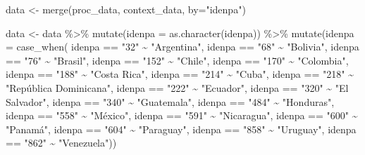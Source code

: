 \documentclass[
  letterpaper,
  DIV=11,
  numbers=noendperiod]{scrartcl}
\newenvironment{Shaded}{\begin{snugshade}}{\end{snugshade}}
\newcommand{\AttributeTok}[1]{\textcolor[rgb]{0.40,0.45,0.13}{#1}}
\newcommand{\FunctionTok}[1]{\textcolor[rgb]{0.28,0.35,0.67}{#1}}
\newcommand{\NormalTok}[1]{\textcolor[rgb]{0.00,0.23,0.31}{#1}}
\newcommand{\OtherTok}[1]{\textcolor[rgb]{0.00,0.23,0.31}{#1}}
\newcommand{\SpecialCharTok}[1]{\textcolor[rgb]{0.37,0.37,0.37}{#1}}
\newcommand{\StringTok}[1]{\textcolor[rgb]{0.13,0.47,0.30}{#1}}
\begin{document}
\begin{Shaded}
\begin{Highlighting}[]
\NormalTok{data }\OtherTok{\textless{}{-}} \FunctionTok{merge}\NormalTok{(proc\_data, context\_data, }\AttributeTok{by=}\StringTok{"idenpa"}\NormalTok{)}
\end{Highlighting}
\end{Shaded}

\begin{Shaded}
\begin{Highlighting}[]
\NormalTok{data }\OtherTok{\textless{}{-}}\NormalTok{ data }\SpecialCharTok{\%\textgreater{}\%}
  \FunctionTok{mutate}\NormalTok{(}\AttributeTok{idenpa =} \FunctionTok{as.character}\NormalTok{(idenpa)) }\SpecialCharTok{\%\textgreater{}\%}
  \FunctionTok{mutate}\NormalTok{(}\AttributeTok{idenpa =} \FunctionTok{case\_when}\NormalTok{(}
\NormalTok{    idenpa }\SpecialCharTok{==} \StringTok{"32"} \SpecialCharTok{\textasciitilde{}} \StringTok{"Argentina"}\NormalTok{,}
\NormalTok{    idenpa }\SpecialCharTok{==} \StringTok{"68"} \SpecialCharTok{\textasciitilde{}} \StringTok{"Bolivia"}\NormalTok{,}
\NormalTok{    idenpa }\SpecialCharTok{==} \StringTok{"76"} \SpecialCharTok{\textasciitilde{}} \StringTok{"Brasil"}\NormalTok{,}
\NormalTok{    idenpa }\SpecialCharTok{==} \StringTok{"152"} \SpecialCharTok{\textasciitilde{}} \StringTok{"Chile"}\NormalTok{,}
\NormalTok{    idenpa }\SpecialCharTok{==} \StringTok{"170"} \SpecialCharTok{\textasciitilde{}} \StringTok{"Colombia"}\NormalTok{,}
\NormalTok{    idenpa }\SpecialCharTok{==} \StringTok{"188"} \SpecialCharTok{\textasciitilde{}} \StringTok{"Costa Rica"}\NormalTok{,}
\NormalTok{    idenpa }\SpecialCharTok{==} \StringTok{"214"} \SpecialCharTok{\textasciitilde{}} \StringTok{"Cuba"}\NormalTok{,}
\NormalTok{    idenpa }\SpecialCharTok{==} \StringTok{"218"} \SpecialCharTok{\textasciitilde{}} \StringTok{"República Dominicana"}\NormalTok{,}
\NormalTok{    idenpa }\SpecialCharTok{==} \StringTok{"222"} \SpecialCharTok{\textasciitilde{}} \StringTok{"Ecuador"}\NormalTok{,}
\NormalTok{    idenpa }\SpecialCharTok{==} \StringTok{"320"} \SpecialCharTok{\textasciitilde{}} \StringTok{"El Salvador"}\NormalTok{,}
\NormalTok{    idenpa }\SpecialCharTok{==} \StringTok{"340"} \SpecialCharTok{\textasciitilde{}} \StringTok{"Guatemala"}\NormalTok{,}
\NormalTok{    idenpa }\SpecialCharTok{==} \StringTok{"484"} \SpecialCharTok{\textasciitilde{}} \StringTok{"Honduras"}\NormalTok{,}
\NormalTok{    idenpa }\SpecialCharTok{==} \StringTok{"558"} \SpecialCharTok{\textasciitilde{}} \StringTok{"México"}\NormalTok{,}
\NormalTok{    idenpa }\SpecialCharTok{==} \StringTok{"591"} \SpecialCharTok{\textasciitilde{}} \StringTok{"Nicaragua"}\NormalTok{,}
\NormalTok{    idenpa }\SpecialCharTok{==} \StringTok{"600"} \SpecialCharTok{\textasciitilde{}} \StringTok{"Panamá"}\NormalTok{,}
\NormalTok{    idenpa }\SpecialCharTok{==} \StringTok{"604"} \SpecialCharTok{\textasciitilde{}} \StringTok{"Paraguay"}\NormalTok{,}
\NormalTok{    idenpa }\SpecialCharTok{==} \StringTok{"858"} \SpecialCharTok{\textasciitilde{}} \StringTok{"Uruguay"}\NormalTok{,}
\NormalTok{    idenpa }\SpecialCharTok{==} \StringTok{"862"} \SpecialCharTok{\textasciitilde{}} \StringTok{"Venezuela"}\NormalTok{))}


\end{Highlighting}
\end{Shaded}
\end{document}
